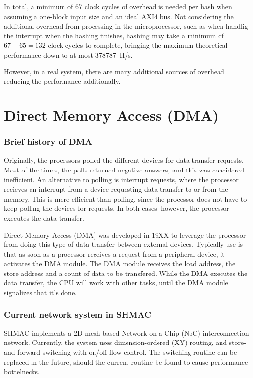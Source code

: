In total, a minimum of 67 clock cycles of overhead is needed per hash when assuming
a one-block input size and an ideal AXI4 bus. Not considering the additional overhead
from processing in the microprocessor, such as when handlig the interrupt when the
hashing finishes, hashing may take a minimum of $67 + 65 = 132$ clock cycles to
complete, bringing the maximum theoretical performance down to at most 378787~H/s.

However, in a real system, there are many additional sources of overhead reducing
the performance additionally.

\section{Direct Memory Access (DMA)}

\subsubsection{Brief history of DMA}

Originally, the processors polled the different devices for data transfer requests. Most of the times, the polls returned negative answers, and this was concidered inefficient. An alternative to polling is interrupt requests, where the processor recieves an interrupt from a device requesting data transfer to or from the memory. This is more efficient than polling, since the processor does not have to keep polling the devices for requests. In both cases, however, the processor executes the data transfer.

Direct Memory Access (DMA) was developed in 19XX to leverage the processor from doing this type of data transfer between external devices. Typically use is that as soon as a processor receives a request from a peripheral device, it activates the DMA module. The DMA module receives the load address, the store address and a count of data to be transfered. While the DMA executes the data transfer, the CPU will work with other tasks, until the DMA module signalizes that it's done.

\subsubsection{Current network system in SHMAC}
SHMAC implements a 2D mesh-based Network-on-a-Chip (NoC) interconnection network. 
Currently, the system uses dimension-ordered (XY) routing, and store-and forward switching with on/off flow control. 
The switching routine can be replaced in the future, should the current routine be found to cause performance bottelnecks.

